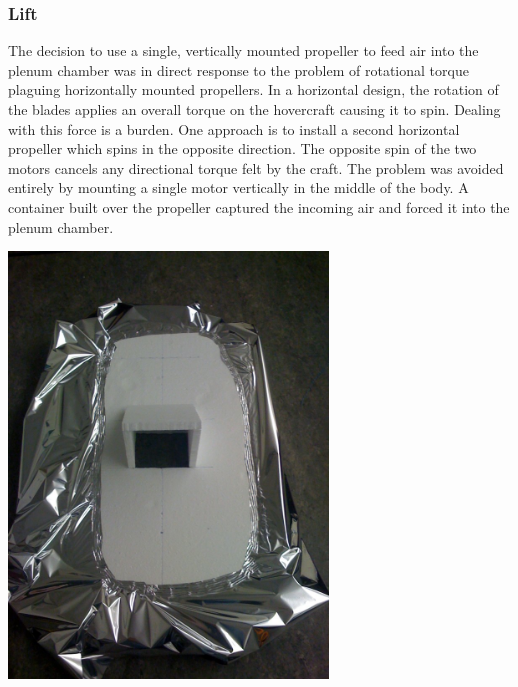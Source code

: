 \subsubsection{Lift}
The decision to use a single, vertically mounted propeller to feed air into the plenum chamber was in direct response to the problem of rotational torque plaguing horizontally mounted propellers. In a horizontal design, the rotation of the blades applies an overall torque on the hovercraft causing it to spin. Dealing with this force is a burden. One approach is to install a second horizontal propeller which spins in the opposite direction. The opposite spin of the two motors cancels any directional torque felt by the craft. The problem was avoided entirely by mounting a single motor vertically in the middle of the body. A container built over the propeller captured the incoming air and forced it into the plenum chamber.

\begin{minipage}{6.5in}
  \begin{center}
    \includegraphics[width=85mm]{imageSources/lift1.png}
  \end{center}
  \label{lif1}
\end{minipage}

